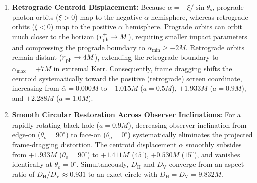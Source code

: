 \begin{enumerate}
    \item \textbf{Retrograde Centroid Displacement:}  
    Because $\alpha = -\xi/\sin\theta_o$, prograde photon orbits ($\xi > 0$) map to the negative $\alpha$ hemisphere, whereas retrograde orbits ($\xi < 0$) map to the positive $\alpha$ hemisphere. Prograde orbits can orbit much closer to the horizon ($r_{\rm ph}^+ \to M$), requiring smaller impact parameters and compressing the prograde boundary to $\alpha_{\min} \ge -2M$. Retrograde orbits remain distant ($r_{\rm ph}^- \to 4M$), extending the retrograde boundary to $\alpha_{\max} = +7M$ in extremal Kerr. Consequently, frame dragging shifts the centroid systematically toward the positive (retrograde) screen coordinate, increasing from $\bar{\alpha} = 0.000M$ to $+1.015M$ ($a=0.5M$), $+1.933M$ ($a=0.9M$), and $+2.288M$ ($a=1.0M$).

    \item \textbf{Smooth Circular Restoration Across Observer Inclinations:}  
    For a rapidly rotating black hole ($a=0.9M$), decreasing observer inclination from edge-on ($\theta_o = 90^\circ$) to face-on ($\theta_o = 0^\circ$) systematically eliminates the projected frame-dragging distortion. The centroid displacement $\bar{\alpha}$ smoothly subsides from $+1.933M$ ($\theta_o=90^\circ$) to $+1.411M$ ($45^\circ$), $+0.530M$ ($15^\circ$), and vanishes identically at $\theta_o = 0^\circ$. Simultaneously, $D_{\mathrm{H}}$ and $D_{\mathrm{V}}$ converge from an aspect ratio of $D_{\mathrm{H}}/D_{\mathrm{V}} \approx 0.931$ to an exact circle with $D_{\mathrm{H}} = D_{\mathrm{V}} = 9.832M$.
\end{enumerate}
